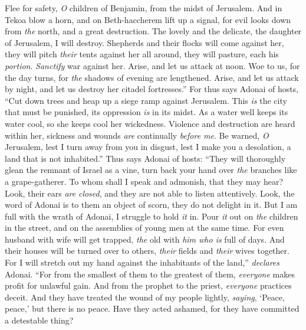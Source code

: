 \begin{biblechapter} %
\verse Flee for safety, \textit{O} children of Benjamin, 
from the midst of Jerusalem. 
And in Tekoa blow a horn, 
and on Beth-haccherem lift up a signal, 
for evil looks down from \textit{the} north, 
and a great destruction.
\verse The lovely and the delicate, 
the daughter of Jerusalem, I will destroy.
\verse Shepherds and their flocks will come against her, 
they will pitch \textit{their} tents against her all around, 
they will pasture, each his \textit{portion}.
\verse \textit{Sanctify} war against her. 
Arise, and let us attack at noon. 
Woe to us, for the day turns, 
for \textit{the} shadows of evening are lengthened.
\verse Arise, and let us attack by night, 
and let us destroy her citadel fortresses.”
\verse For thus says Adonai of hosts, 
“Cut down trees and heap up a siege ramp against Jerusalem. 
This \textit{is} the city that must be punished, 
its oppression \textit{is} in its midst.
\verse As a water well keeps its water cool, 
so she keeps cool her wickedness. 
Violence and destruction are heard within her, 
sickness and wounds \textit{are} continually \textit{before me}.
\verse Be warned, \textit{O} Jerusalem, 
lest I turn away from you in disgust, 
lest I make you a desolation, 
a land that is not inhabited.”
\verse Thus says Adonai of hosts: 
“They will thoroughly glean the remnant of Israel as a vine, 
turn back your hand over \textit{the} branches like a grape-gatherer.
\verse To whom shall I speak and admonish, 
that they may hear? 
Look, their ears \textit{are} \textit{closed}, 
and they are not able to listen attentively. 
Look, the word of Adonai is to them an object of scorn, 
they do not delight in it.
\verse But I am full with the wrath of Adonai, 
I struggle to hold \textit{it} in. 
Pour \textit{it} out on \textit{the} children in the street, 
and on the assemblies of young men at the same time. 
For even husband with wife will get trapped, 
\textit{the} old with \textit{him who is} full of days.
\verse And their houses will be turned over to others, 
\textit{their} fields and \textit{their} wives together. 
For I will stretch out my hand 
against the inhabitants of the land,” \textit{declares} Adonai.
\verse “For from the smallest of them to the greatest of them, 
\textit{everyone} makes profit for unlawful gain. 
And from the prophet to the priest, 
\textit{everyone} practices deceit.
\verse And they have treated the wound of my people lightly, 
\textit{saying}, ‘Peace, peace,’ but there is no peace.
\verse Have they acted ashamed, for they have committed a detestable thing? 

\end{biblechapter}
